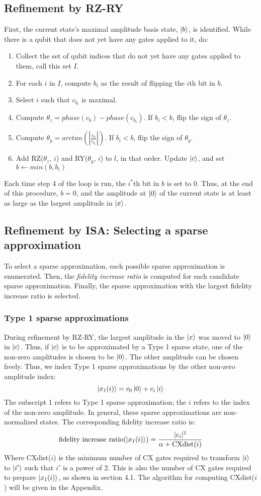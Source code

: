 \documentclass{article}
\begin{document}
\subsection{Refinement by RZ-RY}
First, the current state's maximal amplitude basis state, $\mathinner{|{b}\rangle}$, is 
identified. While there is a qubit that does not yet have any gates applied to 
it, do:
\begin{enumerate}
	\item Collect the set of qubit indices that do not yet have any gates
		applied to them, call this set $I$.
	\item For each $i$ in $I$, compute $b_i$ as the result of flipping the 
		$i$th bit in $b$.
	\item Select $i$ such that $c_{b_i}$ is maximal.
	\item Compute $\theta_z = phase(c_b) - phase(c_{b_i})$. If 
		$b_i < b$, flip the sign of $\theta_z$.
	\item Compute $\theta_y = arctan(|\frac{c_b}{c_{b_i}}|)$. If
		$b_i < b$, flip the sign of $\theta_y$.
	\item Add RZ($\theta_z$, $i$) and RY($\theta_y$, $i$) to $l$, in that
		order. Update $\mathinner{|{c}\rangle}$, and set $b \gets min(b, b_i)$
\end{enumerate}
Each time step 4 of the loop is run, the $i^*$th bit in $b$ is set to
$0$. Thus, at the end of this procedure, $b=0$, and the amplitude at $\mathinner{|{0}\rangle}$
of the current state is at least as large as the largest amplitude in $\mathinner{|{x}\rangle}$.

\subsection{Refinement by ISA: Selecting a sparse approximation}
To select a sparse approximation, each possible sparse approximation is
enumerated. Then, the \textit{fidelity increase ratio} is computed for each
candidate sparse approximation. Finally, the sparse approximation with the
largest fidelity increase ratio is selected.

\subsubsection{Type 1 sparse approximations}
During refinement by RZ-RY, the largest amplitude in the $\mathinner{|{x}\rangle}$ was moved to 
$\mathinner{|{0}\rangle}$ in $\mathinner{|{c}\rangle}$. Thus, if $\mathinner{|{c}\rangle}$ is to be approximated by a Type 1 
sparse state, one of the non-zero amplitudes is chosen to be $\mathinner{|{0}\rangle}$. The 
other amplitude can be chosen freely. Thus, we index Type 1 sparse 
approximations by the other non-zero amplitude index:
$$\mathinner{|{x_1(i)}\rangle} = c_0\mathinner{|{0}\rangle} + c_i\mathinner{|{i}\rangle}$$
The subscript 1 refers to Type 1 sparse approximation; the $i$ refers to the
index of the non-zero amplitude. In general, these sparse approximations are 
non-normalized states. The corresponding fidelity increase ratio is:
$$\text{fidelity increase ratio}(\mathinner{|{x_1(i)}\rangle}) = \frac{|c_i|^2}{\alpha + 
\text{CXdist}(i)}$$
Where CXdist($i$) is the minimum number of CX gates required to transform 
$\mathinner{|{i}\rangle}$ to $\mathinner{|{i'}\rangle}$ such that $i'$ is a power of 2. This is also the number
of CX gates required to prepare $\mathinner{|{x_1(i)}\rangle}$, as shown in section 4.1. The 
algorithm for computing
CXdist($i$) will be given in the Appendix.
\end{document}
